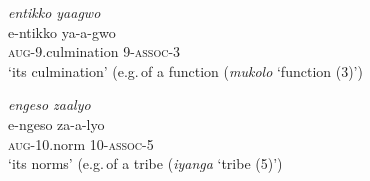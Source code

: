 \ea \label{ex-posspro-other-possessors}
\begin{xlist}	
    \ex \textit{entikko yaagwo}\\
    \gll     e-ntikko ya-a-gwo \\
	\textsc{aug}-9.culmination 9-\textsc{assoc}-3\\
    \glt  ‘its culmination' (e.g.\,of a function (\textit{mukolo} `function (3)')

   \ex \textit{engeso zaalyo}\\
    \gll     e-ngeso za-a-lyo\\
	\textsc{aug}-10.norm 10-\textsc{assoc}-5\\
    \glt  ‘its norms' (e.g.\,of a tribe (\textit{iyanga} `tribe (5)')
\end{xlist}	
\z

\begin{table}
\caption{Possessive pronouns of the third person possessor of noun class 3–22\\ (possessee of noun class 1–8)}
\end{table}
